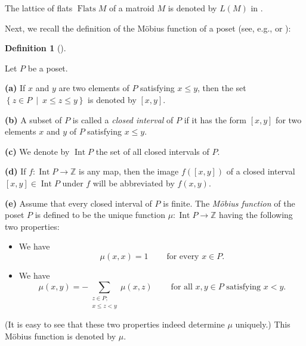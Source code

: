 \documentclass[numbers=enddot,12pt,final,onecolumn,notitlepage]{scrartcl}%
\theoremstyle{definition}
\newtheorem{defi}[theo]{Definition}
\newenvironment{definition}[1][]
{\begin{defi}[#1]\begin{leftbar}}
{\end{leftbar}\end{defi}}
\let\sumnonlimits\sum
\renewcommand{\sum}{\sumnonlimits\limits}
\begin{document}
The lattice of flats $\operatorname*{Flats}M$ of a matroid $M$ is denoted by
$L\left(  M\right)  $ in \cite[\S 3.2]{Stanley}.

Next, we recall the definition of the M\"{o}bius function of a poset (see,
e.g., \cite[Definition 1.2]{Stanley} or \cite[\S 5.2]{Martin15}):

\begin{definition}
\label{def.moebius}Let $P$ be a poset.

\textbf{(a)} If $x$ and $y$ are two elements of $P$ satisfying $x\leq y$, then
the set $\left\{  z\in P\ \mid\ x\leq z\leq y\right\}  $ is denoted by
$\left[  x,y\right]  $.

\textbf{(b)} A subset of $P$ is called a \textit{closed interval} of $P$ if it
has the form $\left[  x,y\right]  $ for two elements $x$ and $y$ of $P$
satisfying $x\leq y$.

\textbf{(c)} We denote by $\operatorname*{Int}P$ the set of all closed
intervals of $P$.

\textbf{(d)} If $f:\operatorname*{Int}P\rightarrow\mathbb{Z}$ is any map, then
the image $f\left(  \left[  x,y\right]  \right)  $ of a closed interval
$\left[  x,y\right]  \in\operatorname*{Int}P$ under $f$ will be abbreviated by
$f\left(  x,y\right)  $.

\textbf{(e)} Assume that every closed interval of $P$ is finite. The
\textit{M\"{o}bius function} of the poset $P$ is defined to be the unique
function $\mu:\operatorname*{Int}P\rightarrow\mathbb{Z}$ having the following
two properties:

\begin{itemize}
\item We have
\begin{equation}
\mu\left(  x,x\right)  =1\ \ \ \ \ \ \ \ \ \ \text{for every }x\in P.
\label{eq.def.moebius.rec1}%
\end{equation}


\item We have%
\begin{equation}
\mu\left(  x,y\right)  =-\sum_{\substack{z\in P;\\x\leq z<y}}\mu\left(
x,z\right)  \ \ \ \ \ \ \ \ \ \ \text{for all }x,y\in P\text{ satisfying }x<y.
\label{eq.def.moebius.rec2}%
\end{equation}

\end{itemize}

(It is easy to see that these two properties indeed determine $\mu$ uniquely.)
This M\"{o}bius function is denoted by $\mu$.
\end{definition}
\end{document}
